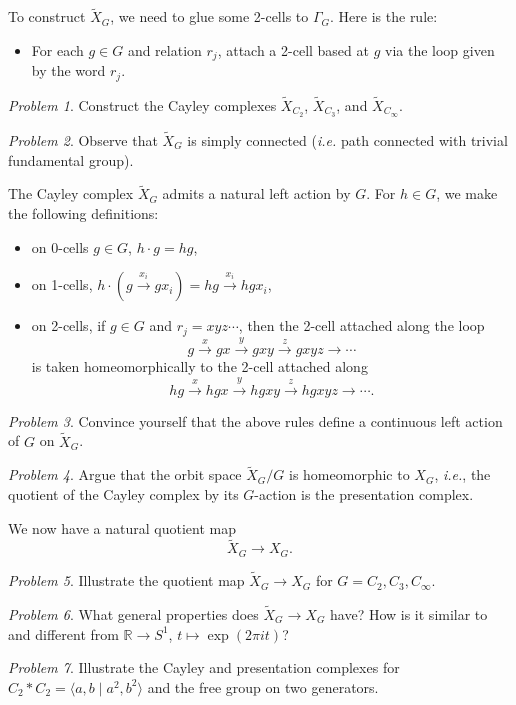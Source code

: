 \documentclass[11pt,twoside]{amsart}
\theoremstyle{plain}
\theoremstyle{remark}
\newtheorem{prob}{Problem}
\theoremstyle{definition}
\theoremstyle{definition}
\newcommand{\RR}{\mathbb{R}}
\begin{document}
To construct $\tilde X_G$, we need to glue some 2-cells to $\Gamma_G$. Here is the rule:
\begin{itemize}
\item For each $g\in G$ and relation $r_j$, attach a 2-cell based at $g$ via the loop given by the word $r_j$.
\end{itemize}

\begin{prob}
Construct the Cayley complexes $\tilde X_{C_2}$, $\tilde X_{C_3}$, and $\tilde X_{C_{\infty}}$.
\end{prob}

\begin{prob}
Observe that $\tilde X_G$ is simply connected (\emph{i.e.} path connected with trivial fundamental group).
\end{prob}

The Cayley complex $\tilde X_G$ admits a natural left action by $G$. For $h\in G$, we make the following definitions:
\begin{itemize}
\item on 0-cells $g\in G$, $h\cdot g = hg$,
\item on 1-cells, $h\cdot(g\xrightarrow{x_i}gx_i) = hg\xrightarrow{x_i}hgx_i$,
\item on 2-cells, if $g\in G$ and $r_j = xyz\cdots$, then the 2-cell attached along the loop \[g\xrightarrow{x}gx\xrightarrow{y}gxy\xrightarrow{z}gxyz\to\cdots\] is taken homeomorphically to the 2-cell attached along \[hg\xrightarrow{x}hgx\xrightarrow{y}hgxy\xrightarrow{z}hgxyz\to\cdots.\]
\end{itemize}

\begin{prob}
Convince yourself that the above rules define a continuous left action of $G$ on $\tilde X_G$.
\end{prob}

\begin{prob}
Argue that the orbit space $\tilde X_G/G$ is homeomorphic to $X_G$, \emph{i.e.}, the quotient of the Cayley complex by its $G$-action is the presentation complex.
\end{prob}

We now have a natural quotient map
\[
  \tilde X_G\longrightarrow X_G.
\]

\begin{prob}
Illustrate the quotient map $\tilde X_G\to X_G$ for $G = C_2,C_3,C_\infty$.
\end{prob}

\begin{prob}
What general properties does $\tilde X_G\to X_G$ have? How is it similar to and different from $\RR\to S^1$, $t\mapsto \exp(2\pi it)$?
\end{prob}

\begin{prob}
Illustrate the Cayley and presentation complexes for $C_2*C_2 = \langle a,b\mid a^2,b^2\rangle$ and the free group on two generators.
\end{prob}
\end{document}
